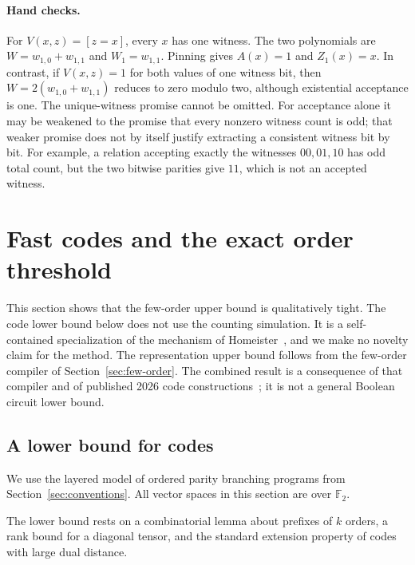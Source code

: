 \documentclass[11pt]{article}
\theoremstyle{definition}
\theoremstyle{remark}
\begin{document}
\paragraph{Hand checks.}
For $V(x,z)=[z=x]$, every $x$ has one witness. The two polynomials
are $W=w_{1,0}+w_{1,1}$ and $W_1=w_{1,1}$. Pinning gives
$A(x)=1$ and $Z_1(x)=x$. In contrast, if $V(x,z)=1$ for both values
of one witness bit, then $W=2(w_{1,0}+w_{1,1})$ reduces to zero
modulo two, although existential acceptance is one. The unique-witness
promise cannot be omitted. For acceptance alone it may be weakened
to the promise that every nonzero witness count is odd; that weaker
promise does not by itself justify extracting a consistent witness
bit by bit. For example, a relation accepting exactly the witnesses
$00,01,10$ has odd total count, but the two bitwise parities give
$11$, which is not an accepted witness.

\section{Fast codes and the exact order threshold}
\label{sec:parity-findings}

This section shows that the few-order upper bound is qualitatively
tight. The code lower bound below does not use the counting simulation.
It is a self-contained specialization of the mechanism of
Homeister~\cite[Theorem~1]{Homeister03}, and we make no novelty claim
for the method. The representation upper bound follows from the
few-order compiler of Section~\ref{sec:few-order}. The combined result
is a consequence of that compiler and of published 2026 code
constructions~\cite{BR26,BIR26}; it is not a general Boolean circuit
lower bound.

\subsection{A lower bound for codes}

We use the layered model of ordered parity branching programs from
Section~\ref{sec:conventions}. All vector spaces in this section are
over $\mathbb F_2$.

The lower bound rests on a combinatorial lemma about prefixes of $k$
orders, a rank bound for a diagonal tensor, and the standard extension
property of codes with large dual distance.
\end{document}
